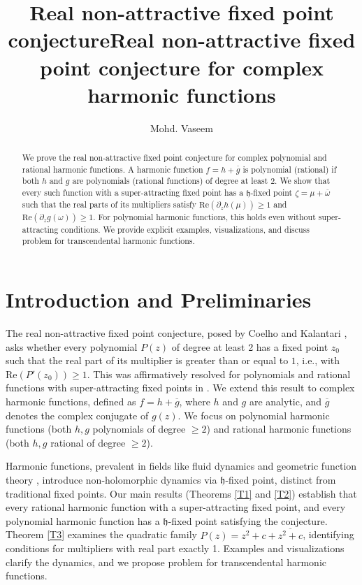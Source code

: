 \documentclass[a4paper,12pt,reqno]{amsart}
\title{Real non-attractive fixed point conjecture}
\author[M. Vaseem]{Mohd. Vaseem }
\begin{document}
\title[Real non-attractive fixed point conjecture for complex harmonic functions]{Real non-attractive fixed point conjecture for complex harmonic functions}
\begin{abstract}
We prove the real non-attractive fixed point conjecture for complex polynomial and rational harmonic functions. A harmonic function $f=h+\overline{g}$ is polynomial (rational) if both $h$ and $g$ are polynomials (rational functions) of degree at least 2. We show that every such function with a super-attracting fixed point has a $\mathfrak{h}$-fixed point  $\zeta=\mu+\overline{\omega}$ such that the real parts of its multipliers satisfy $\text{Re}(\partial_z h(\mu)) \geq 1$ and $\text{Re}(\partial_z g(\omega)) \geq 1$. For polynomial harmonic functions, this holds even without super-attracting conditions. We provide explicit examples, visualizations, and discuss problem for transcendental harmonic functions.
\end{abstract}
\maketitle
\section{Introduction and Preliminaries}
  The real non-attractive fixed point conjecture, posed by Coelho and Kalantari \cite{How many real attractive fixed points can a polynomial have?}, asks whether every polynomial $P(z)$ of degree at least 2 has a fixed point $z_0$ such that the real part of its multiplier is greater than or equal to $1$, i.e.,  with $\text{Re}(P'(z_0)) \geq 1$. This was affirmatively resolved for polynomials and rational functions with super-attracting fixed points in \cite{The real non-attractive fixed point conjecture and beyond}. We extend this result to complex harmonic functions, defined as $f = h + \overline{g}$, where $h$ and $g$ are analytic, and $\overline{g}$ denotes the complex conjugate of $g(z)$. We focus on polynomial harmonic functions (both $h, g$ polynomials of degree $\geq 2$) and rational harmonic functions (both $h, g$ rational of degree $\geq 2$).

Harmonic functions, prevalent in fields like fluid dynamics and geometric function theory \cite{Some questions about complex harmonic functions}, introduce non-holomorphic dynamics via $\mathfrak{h}$-fixed point, distinct from traditional fixed points. Our main results (Theorems \ref{T1} and \ref{T2}) establish that every rational harmonic function with a super-attracting fixed point, and every polynomial harmonic function has a $\mathfrak{h}$-fixed point satisfying the conjecture. Theorem \ref{T3} examines the quadratic family $P(z) = z^2 + c + \overline{z^2 + c}$, identifying conditions for multipliers with real part exactly 1. Examples and visualizations clarify the dynamics, and we propose problem for transcendental harmonic functions.
\end{document}
